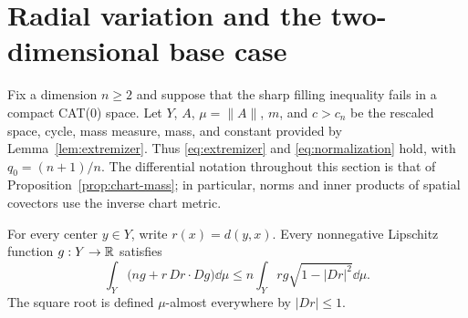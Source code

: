 \section{Radial variation and the two-dimensional base case}
\label{sec:radial}

Fix a dimension $n\geq 2$ and suppose that the sharp filling inequality
fails in a compact CAT(0) space.  Let $Y$, $A$, $\mu=\|A\|$, $m$, and
$c>c_n$ be the rescaled space, cycle, mass measure, mass, and constant
provided by Lemma~\ref{lem:extremizer}.  Thus
\eqref{eq:extremizer} and \eqref{eq:normalization} hold, with
$q_0=(n+1)/n$.  The differential notation throughout this section is
that of Proposition~\ref{prop:chart-mass}; in particular, norms and inner
products of spatial covectors use the inverse chart metric.

\begin{proposition}
\label{prop:radial}
For every center $y\in Y$, write $r(x)=d(y,x)$.  Every nonnegative
Lipschitz function $g:Y\to\mathbb R$ satisfies
\begin{equation}
 \int_Y \bigl(ng+r\,Dr\cdot Dg\bigr)\dd\mu
 \leq n\int_Y rg\sqrt{1-|Dr|^2}\dd\mu.
 \label{eq:radial}
\end{equation}
The square root is defined $\mu$-almost everywhere by
$|Dr|\leq 1$.
\end{proposition}

